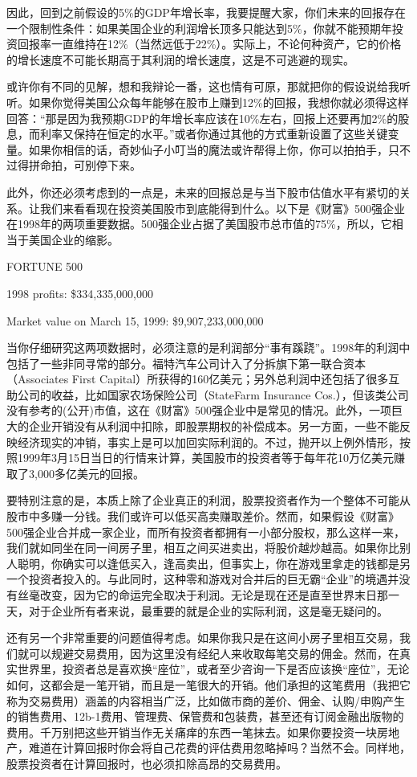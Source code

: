 \documentclass[UTF8,a4paper,zihao=-4,fontset = windows]{ctexart} %
\begin{document}
因此，回到之前假设的5\%的GDP年增长率，我要提醒大家，你们未来的回报存在一个限制性条件：如果美国企业的利润增长顶多只能达到5\%，你就不能预期年投资回报率一直维持在12\%（当然远低于22\%）。实际上，不论何种资产，它的价格的增长速度不可能长期高于其利润的增长速度，这是不可逃避的现实。

或许你有不同的见解，想和我辩论一番，这也情有可原，那就把你的假设说给我听听。如果你觉得美国公众每年能够在股市上赚到12\%的回报，我想你就必须得这样回答：“那是因为我预期GDP的年增长率应该在10\%左右，回报上还要再加2\%的股息，而利率又保持在恒定的水平。”或者你通过其他的方式重新设置了这些关键变量。如果你相信的话，奇妙仙子小叮当的魔法或许帮得上你，你可以拍拍手，只不过得拼命拍，可别停下来。

此外，你还必须考虑到的一点是，未来的回报总是与当下股市估值水平有紧切的关系。让我们来看看现在投资美国股市到底能得到什么。以下是《财富》500强企业在1998年的两项重要数据。500强企业占据了美国股市总市值的75\%，所以，它相当于美国企业的缩影。

FORTUNE 500

1998 profits: \$334,335,000,000

Market value on March 15, 1999: \$9,907,233,000,000

当你仔细研究这两项数据时，必须注意的是利润部分“事有蹊跷”。1998年的利润中包括了一些非同寻常的部分。福特汽车公司计入了分拆旗下第一联合资本（Associates First Capital）所获得的160亿美元；另外总利润中还包括了很多互助公司的收益，比如国家农场保险公司（StateFarm Insurance Cos.），但该类公司没有参考的(公开)市值，这在《财富》500强企业中是常见的情况。此外，一项巨大的企业开销没有从利润中扣除，即股票期权的补偿成本。另一方面，一些不能反映经济现实的冲销，事实上是可以加回实际利润的。不过，抛开以上例外情形，按照1999年3月15日当日的行情来计算，美国股市的投资者等于每年花10万亿美元赚取了3,000多亿美元的回报。

要特别注意的是，本质上除了企业真正的利润，股票投资者作为一个整体不可能从股市中多赚一分钱。我们或许可以低买高卖赚取差价。然而，如果假设《财富》500强企业合并成一家企业，而所有投资者都拥有一小部分股权，那么这样一来，我们就如同坐在同一间房子里，相互之间买进卖出，将股价越炒越高。如果你比别人聪明，你确实可以逢低买入，逢高卖出，但事实上，你在游戏里拿走的钱都是另一个投资者投入的。与此同时，这种零和游戏对合并后的巨无霸“企业”的境遇并没有丝毫改变，因为它的命运完全取决于利润。无论是现在还是直至世界末日那一天，对于企业所有者来说，最重要的就是企业的实际利润，这是毫无疑问的。

还有另一个非常重要的问题值得考虑。如果你我只是在这间小房子里相互交易，我们就可以规避交易费用，因为这里没有经纪人来收取每笔交易的佣金。然而，在真实世界里，投资者总是喜欢换“座位”，或者至少咨询一下是否应该换“座位”，无论如何，这都会是一笔开销，而且是一笔很大的开销。他们承担的这笔费用（我把它称为交易费用）涵盖的内容相当广泛，比如做市商的差价、佣金、认购/申购产生的销售费用、12b-1费用、管理费、保管费和包装费，甚至还有订阅金融出版物的费用。千万别把这些开销当作无关痛痒的东西一笔抹去。如果你要投资一块房地产，难道在计算回报时你会将自己花费的评估费用忽略掉吗？当然不会。同样地，股票投资者在计算回报时，也必须扣除高昂的交易费用。
\end{document}
